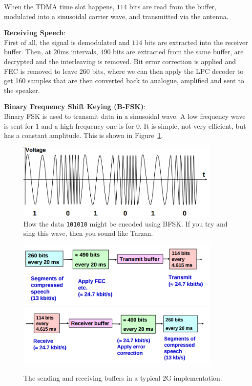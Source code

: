 \begin{description}
    When the TDMA time slot happens, $114$ bits are read from the buffer,
    modulated into a sinusoidal carrier wave, and transmitted via the antenna.
  \item \textbf{Receiving Speech}:\\
    First of all, the signal is demodulated and $114$ bits are extracted into
    the receiver buffer. Then, at $20\si{\milli\second}$ intervals, $490$ bits
    are extracted from the same buffer, are decrypted and the interleaving is
    removed. Bit error correction is applied and FEC is removed to leave $260$
    bits, where we can then apply the LPC decoder to get 160 samples that are
    then converted back to analogue, amplified and sent to the speaker.
  \item \textbf{Binary Frequency Shift Keying (B-FSK)}:\\
    Binary FSK is used to transmit data in a sinusoidal wave. A low frequency
    wave is sent for $1$ and a high frequency one is for $0$. It is simple, not
    very efficient, but has a constant amplitude. This is shown in
    Figure~\ref{BFSK}.
    \begin{figure}[ht]
      \includegraphics[width=0.9\textwidth]{images/BFSK}    
      \caption{How the data \texttt{101010} might be encoded using BFSK. If you
      try and sing this wave, then you sound like Tarzan.}
      \label{BFSK}
    \end{figure}
\end{description}

\begin{figure}[ht]
  \includegraphics[width=0.9\textwidth]{images/2g-buffer-send}
  \includegraphics[width=0.9\textwidth]{images/2g-buffer-rec}
  \caption{The sending and receiving buffers in a typical 2G implementation.}
  \label{2g-buffers}
\end{figure}

